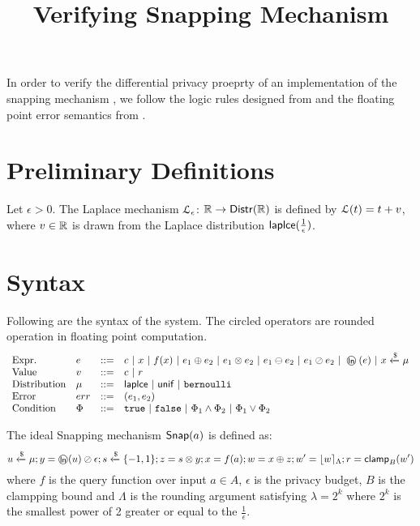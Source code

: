 \documentclass[a4paper,11pt]{article}
\begin{document}
\title{Verifying Snapping Mechanism}

\maketitle
In order to verify the differential privacy proeprty of an implementation of the snapping mechanism \cite{mironov2012significance}, we follow the logic rules designed from \cite{barthe2016proving} and the floating point error semantics from \cite{Ramananandro2016unified,Martel2006higher,Becker2018verified,Moscato2017Automatic}.

\section{Preliminary Definitions}
\begin{defn}
Let $\epsilon > 0$. The Laplace mechanism  $\mathcal{L}_{\epsilon}$: $\mathbb{R} \to \mathsf{Distr}(\mathbb{R})$ is defined by $\mathcal{L}(t) = t + v$, where $v \in \mathbb{R}$ is drawn from the Laplace distribution $\mathsf{laplce}(\frac{1}{\epsilon})$.
\end{defn}




\section{Syntax}
Following are the syntax of the system. The circled operators are rounded operation in floating point computation.
\[\begin{array}{llll}
\mbox{Expr.} & \expr & ::= & \eflconst
	~|~ x ~|~ f(x) ~|~ \expr_1 \oplus \expr_2 
	~|~ \expr_1 \otimes \expr_2 ~|~ \expr_1 \ominus \expr_2 
	~|~ \expr_1 \oslash \expr_2 ~|~ \oln (\expr) ~|~ x \samplel \edistr \\
%
\mbox{Value} & \valr & ::= & \eflconst ~|~  \erlconst \\
%
\mbox{Distribution} & \edistr & ::= & \laplace ~|~ \uniform ~|~ \bernoulli \\ 
%
\mbox{Error} & \err & ::= & (\expr_1, \expr_2) \\

\mbox{Condition} & \condition & ::= & 
	\etrue ~|~ \efalse ~|~ \condition_1 \land \condition_2 
	~|~ \condition_1 \lor \condition_2

\end{array}\]


\begin{defn}
The ideal Snapping mechanism $\mathsf{Snap}( a)$ is defined as:
\[
	u \xleftarrow{\$} \edistr; y = \oln (u) \oslash \epsilon; s \samplel \{-1, 1\}; z = s \otimes y; x = f(a); w = x \oplus z; w' = \round{w}_{\Lambda}; r = \clamp_B (w')
\]
where $f$ is the query function over input $a \in A$, $\epsilon$ is the privacy budget, $B$ is the clampping bound and $\Lambda$ is the rounding argument satisfying $\lambda = 2^k$ where $2^k$ is the smallest power of 2 greater or equal to the $\frac{1}{\epsilon}$.
\end{defn}
\end{document}
